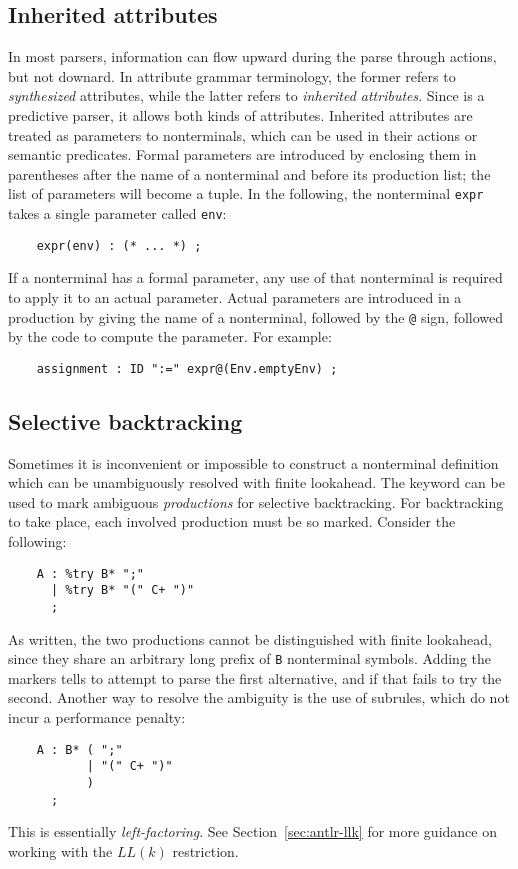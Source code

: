 \subsection{Inherited attributes}\label{sec:inh-attr}

In most parsers, information can flow upward during the parse through actions, but not downard.  In attribute grammar terminology, the former refers to \emph{synthesized} attributes, while the latter refers to \emph{inherited attributes}.  Since \antlr{} is a predictive parser, it allows both kinds of attributes.  Inherited attributes are treated as parameters to nonterminals, which can be used in their actions or semantic predicates.  Formal parameters are introduced by enclosing them in parentheses after the name of a nonterminal and before its production list; the list of parameters will become a tuple.  In the following, the nonterminal \texttt{expr} takes a single parameter called \texttt{env}:
\begin{verbatim}
    expr(env) : (* ... *) ;
\end{verbatim}
If a nonterminal has a formal parameter, any use of that nonterminal is required to apply it to an actual parameter.  Actual parameters are introduced in a production by giving the name of a nonterminal, followed by the \texttt{@} sign, followed by the code to compute the parameter.  For example:
\begin{verbatim}
    assignment : ID ":=" expr@(Env.emptyEnv) ;
\end{verbatim}

\subsection{Selective backtracking}

Sometimes it is inconvenient or impossible to construct a nonterminal definition which can be unambiguously resolved with finite lookahead.
The  keyword can be used to mark ambiguous \emph{productions} for selective backtracking.  For backtracking to take place, each involved production must be so marked.  Consider the following:
\begin{verbatim}
    A : %try B* ";"
      | %try B* "(" C+ ")"
      ;
\end{verbatim}
As written, the two productions cannot be distinguished with finite lookahead, since they share an arbitrary long prefix of \texttt{B} nonterminal symbols.  Adding the  markers tells \antlr{} to attempt to parse the first alternative, and if that fails to try the second.  Another way to resolve the ambiguity is the use of subrules, which do not incur a performance penalty:
\begin{verbatim}
    A : B* ( ";"
           | "(" C+ ")"
           )
      ;
\end{verbatim}
This is essentially \emph{left-factoring}. See Section~\ref{sec:antlr-llk} for more guidance on working with the $LL(k)$ restriction.

